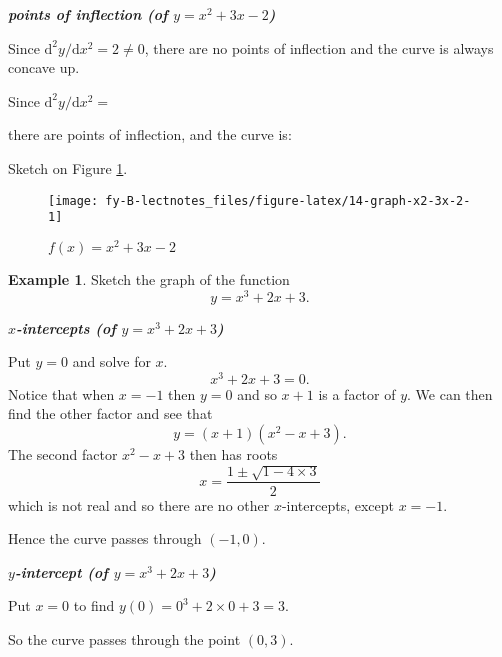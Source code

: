 \documentclass[
  11pt,
  oneside]{book}
\newcommand{\slide}{}
\theoremstyle{definition}
\theoremstyle{definition}
\newtheorem{example}{Example}[chapter]
\theoremstyle{definition}
\theoremstyle{definition}
\theoremstyle{remark}
\begin{document}
\slide

\textbf{\emph{points of inflection (of \(y = x^2+3x-2\))}}

\begin{notslides}

Since \(\mathrm{d}^2y/\mathrm{d}x^2 = 2\ne0\), there are no points of inflection
and the curve is always concave up.

\end{notslides}

\begin{slidesonly}

Since \(\mathrm{d}^2y/\mathrm{d}x^2 =\)

there are \phantom{nonono} points of inflection, and the curve is:
\vfill

\end{slidesonly}

Sketch on Figure \ref{fig:14-graph-x2-3x-2}.

\begin{figure}

{\centering \texttt{[image: fy-B-lectnotes\_files/figure-latex/14-graph-x2-3x-2-1]} 

}

\caption{$f(x)=x^2+3x-2$}\label{fig:14-graph-x2-3x-2}
\end{figure}
\slide

\begin{example}
Sketch the graph of the function
\[
y = x^3+2x+3.
\]
\end{example}

\textbf{\emph{\(x\)-intercepts (of \(y = x^3+2x+3\))}}

\begin{notslides}

Put \(y=0\) and solve for \(x\).
\[
x^3+2x+3 = 0.
\]
Notice that when \(x=-1\) then \(y=0\) and so \(x+1\) is a factor of \(y\). We can then find the other factor and see that
\[
y = (x+1)(x^2-x+3).
\]
The second factor \(x^2-x+3\) then has roots
\[
x = \frac{1\pm\sqrt{1-4\times3}}{2}
\]
which is not real and so there are no other \(x\)-intercepts, except \(x=-1\).

Hence the curve passes through \((-1,0)\).

\end{notslides}

\slide

\textbf{\emph{\(y\)-intercept (of \(y = x^3+2x+3\))}}

\begin{notslides}

Put \(x=0\) to find \(y(0) = 0^3+2\times0+3 = 3\).

So the curve passes through the point \((0,3)\).

\end{notslides}
\end{document}
